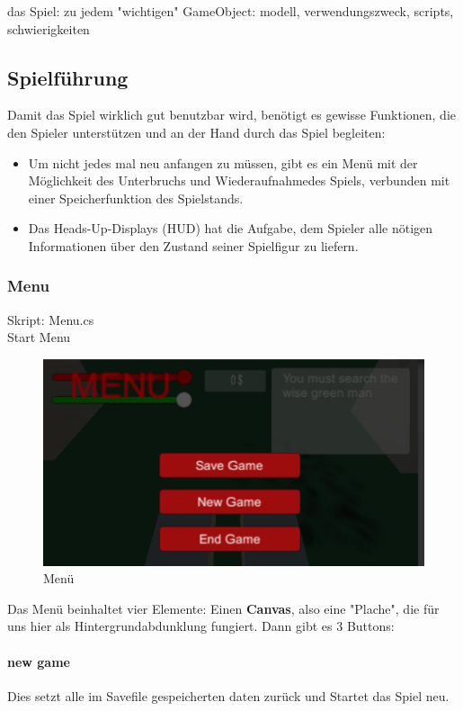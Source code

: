 das Spiel: 
	zu jedem "wichtigen" GameObject:
	modell, verwendungszweck, scripts, 				schwierigkeiten

\subsection{Spielführung}
Damit das Spiel wirklich gut benutzbar wird, benötigt es gewisse Funktionen, die den Spieler unterstützen und an der Hand durch das Spiel begleiten:
\begin{itemize}
\item Um nicht jedes mal neu anfangen zu müssen, gibt es ein Menü mit der Möglichkeit des Unterbruchs und Wiederaufnahmedes Spiels, verbunden mit einer Speicherfunktion des Spielstands.
\item Das Heads-Up-Displays (HUD) hat die Aufgabe, dem Spieler alle nötigen Informationen über den Zustand seiner Spielfigur zu liefern.
\end{itemize}



\subsubsection{Menu}
Skript: Menu.cs\\
Start Menu

\begin{figure}[H]
\includegraphics[scale=1]{screenshots/menuscreen.png}
\caption{Menü}
\end{figure}

Das Menü beinhaltet vier Elemente: Einen \textbf{Canvas}, also eine "Plache", die für uns hier als Hintergrundabdunklung fungiert.
Dann gibt es 3 Buttons:
\paragraph{new game}
Dies setzt alle im Savefile gespeicherten daten zurück und Startet das Spiel neu.

